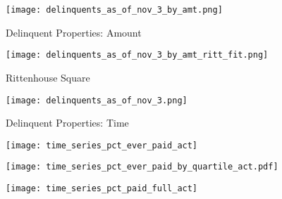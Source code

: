 \documentclass[12pt,titlepage]{article}
\begin{document}

\begin{figure}[htpb]
\begin{center}
\caption{Delinquent Properties: Amount}\label{fig:map_amt}
\bigskip
\texttt{[image: delinquents\_as\_of\_nov\_3\_by\_amt.png]}
\end{center}
\end{figure}
\newpage
\begin{figure}[htpb]
\begin{center}
\caption{Rittenhouse Square}\label{fig:map_rit_amt}
\bigskip
\texttt{[image: delinquents\_as\_of\_nov\_3\_by\_amt\_ritt\_fit.png]}
\end{center}
\end{figure}
\newpage
\begin{figure}[htpb]
\begin{center}
\caption{Delinquent Properties: Time}\label{fig:map_time}
\bigskip
\texttt{[image: delinquents\_as\_of\_nov\_3.png]}
\end{center}
\end{figure}
\newpage
\begin{figure}[htbp]
\caption{}\label{ever_paid_act}
\begin{center}
\texttt{[image: time\_series\_pct\_ever\_paid\_act]}
\par\end{center}
\end{figure}
\newpage
\begin{figure}[htbp]
\caption{}\label{ever_paid_quar}
\begin{center}
\texttt{[image: time\_series\_pct\_ever\_paid\_by\_quartile\_act.pdf]}
\par\end{center}
\end{figure}
\newpage
\begin{figure}[htbp]
\begin{center}
\caption{} \label{paid_full_act}
\texttt{[image: time\_series\_pct\_paid\_full\_act]}
\par\end{center}
\end{figure}
\end{document}
